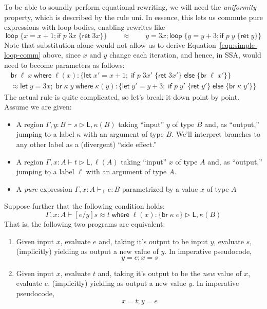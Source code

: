 \documentclass[acmsmall,screen,review]{acmart}
\newcommand{\ms}[1]{\ensuremath{\mathsf{#1}}}
\newcommand{\lto}{:}
\newcommand{\letexpr}[3]{\ensuremath{\ms{let}\;#1 = #2;\;#3}}
\newcommand{\brb}[2]{\ms{br}\;#1\;#2}
\newcommand{\where}[2]{#1\;\ms{where}\;#2}
\newcommand{\wbranch}[3]{#1(#2) \lto \{#3\}}
\newcommand{\bhyp}[2]{#1 : #2}
\newcommand{\hasty}[4]{#1 \vdash_{#2} #3: {#4}}
\newcommand{\haslb}[3]{#1 \vdash #2 \rhd #3}
\newcommand{\teqv}{\approx}
\newcommand{\lbeq}[4]{#1 \vdash #2 \teqv #3 \rhd {#4}}
\newcommand{\brle}[1]{{\scriptsize\textsf{#1}}}
\begin{document}
To be able to soundly perform equational rewriting, we will need the \emph{uniformity} property,
which is described by the rule \brle{uni}. In essence, this lets us commute pure expressions with
loop bodies, enabling rewrites like
\begin{equation}
  \ms{loop}\;\{ x = x + 1; \ms{if}\;p\;3x\;\{\ms{ret}\;3x\} \}
  \qquad \teqv \qquad 
  y = 3x; \ms{loop}\;\{ y = y + 3; \ms{if}\;p\;y\;\{\ms{ret}\;y\} \}
  \label{eqn:simple-loop-comm} 
\end{equation}
Note that substitution alone would not allow us to derive Equation~\ref{eqn:simple-loop-comm} above,
since $x$ and $y$ change each iteration, and hence, in SSA, would need to become parameters as
follows:
\begin{multline}
  \where{\brb{\ell}{x}}{\wbranch{\ell}{x}
    {\letexpr{x'}{x + 1}{\ms{if}\;p\;3x'\;\{\ms{ret}\;3x'\}\;\ms{else}\;\{\brb{\ell}{x'}\}}}}
  \\ \teqv
  \where{\letexpr{y}{3x}{\brb{\kappa}{y}}}{\wbranch{\kappa}{y}
    {\letexpr{y'}{y + 3}{\ms{if}\;p\;y'\;\{\ms{ret}\;y'\}\;\ms{else}\;\{\brb{\kappa}{y'}\}}}}
\end{multline}
The actual rule is quite complicated, so let's break it down point by point. Assume we are given:
\begin{itemize}
  \item A region $\haslb{\Gamma, \bhyp{y}{B}}{s}{\ms{L}, \kappa(B)}$ taking ``input'' $y$ of type
    $B$ and, as ``output,'' jumping to a label $\kappa$ with an argument of type $B$. We'll
    interpret branches to any other label as a (divergent) ``side effect.''
  \item A region $\haslb{\Gamma, \bhyp{x}{A}}{t}{\ms{L}, \ell(A)}$ taking ``input'' $x$ of type
    $A$ and, as ``output,'' jumping to a label $\ell$ with an argument of type $A$.
  \item A \emph{pure} expression $\hasty{\Gamma, \bhyp{x}{A}}{\bot}{e}{B}$ parametrized by a value
    $x$ of type $A$
\end{itemize}
Suppose further that the following condition holds:
$$
  \lbeq{\Gamma, \bhyp{x}{A}}{[e/y]s}{\where{t}{\wbranch{\ell}{x}{\brb{\kappa}{e}}}}
    {\ms{L}, \kappa(B)}
$$
That is, the following two programs are equivalent:
\begin{enumerate}[label=(\alph*)]
  \item Given input $x$, evaluate $e$ and, taking it's output to be input $y$, evaluate $s$,
  (implicitly) yielding as output a new value of $y$. In imperative pseudocode,
  $$
    y = e; x = s
  $$
  \item Given input $x$, evaluate $t$ and, taking it's output to be the \emph{new} value of $x$,
  evaluate $e$, (implicitly) yielding as output a new value $y$. In imperative pseudocode,
  $$
    x = t; y = e
  $$
\end{enumerate}
\end{document}
